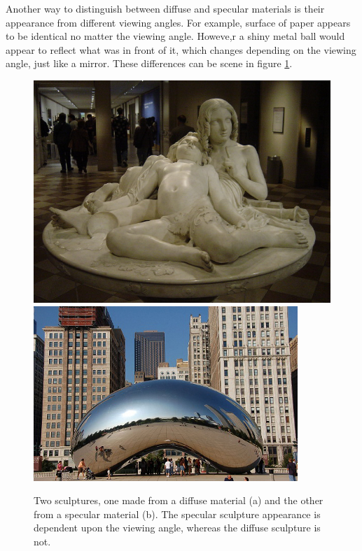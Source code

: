 \documentclass[../dissertation.tex]{subfiles}
\begin{document}
Another way to distinguish between diffuse and specular materials is their appearance from different viewing angles. For example, surface of paper appears to be identical no matter the viewing angle. Howeve,r a shiny metal ball would appear to reflect what was in front of it, which changes depending on the viewing angle, just like a mirror. These differences can be scene in figure \ref{fig:material_pics}.

\begin{figure}[h]
\centering
{}
  \includegraphics[width=\textwidth]{images/diffuse_sculpture.jpeg}   
\endminipage\hspace{5em}
  \includegraphics[width=\textwidth]{images/specular_sculpture.jpg}
\endminipage
\caption{Two sculptures, one made from a diffuse material (a) and the other from a specular material (b). The specular sculpture appearance is dependent upon the viewing angle, whereas the diffuse sculpture is not.}
\label{fig:material_pics}
\end{figure}
\end{document}

